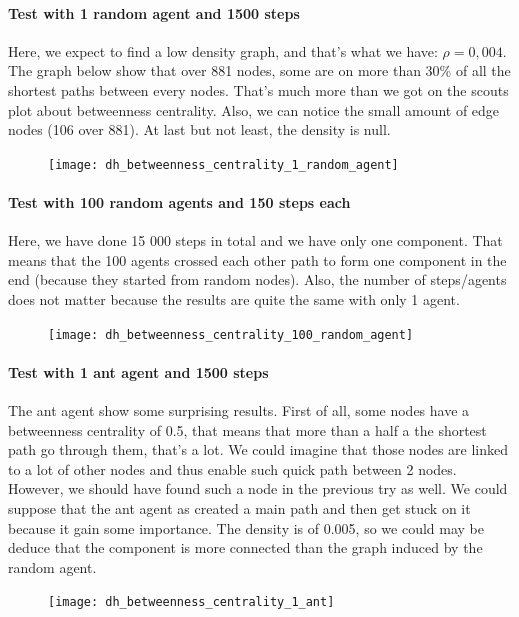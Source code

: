 \documentclass{article}
\begin{document}
		\paragraph{Test with 1 random agent and 1500 steps}
			Here, we expect to find a low density graph, and that's what we have: $\rho = 0,004$.
			The graph below show that over 881 nodes, some are on more than 30\% of all the shortest paths between every nodes.
			That's much more than we got on the scouts plot about betweenness centrality.
			Also, we can notice the small amount of edge nodes (106 over 881).
			At last but not least, the density is null.
		\begin{figure}[!h]\hspace{2cm}
			\texttt{[image: dh\_betweenness\_centrality\_1\_random\_agent]}
		\end{figure}
		\paragraph{Test with 100 random agents and 150 steps each}
			Here, we have done 15 000 steps in total and we have only one component.
			That means that the 100 agents crossed each other path to form one component in the end
			(because they started from random nodes).
			Also, the number of steps/agents does not matter because the results are quite the same with only 1 agent.
		\begin{figure}[!h]\hspace{2cm}
			\texttt{[image: dh\_betweenness\_centrality\_100\_random\_agent]}
		\end{figure}
		\paragraph{Test with 1 ant agent and 1500 steps}
			The ant agent show some surprising results.
			First of all, some nodes have a betweenness centrality of 0.5,
			that means that more than a half a the shortest path go through them, that's a lot.
			We could imagine that those nodes are linked to a lot of other nodes and thus enable such quick path between 2 nodes.
			However, we should have found such a node in the previous try as well.
			We could suppose that the ant agent as created a main path and then get stuck on it because it gain some importance.
			The density is of 0.005,
			so we could may be deduce that the component is more connected than the graph induced by the random agent.
		\begin{figure}[!h]\hspace{2cm}
			\texttt{[image: dh\_betweenness\_centrality\_1\_ant]}
		\end{figure}
\end{document}
